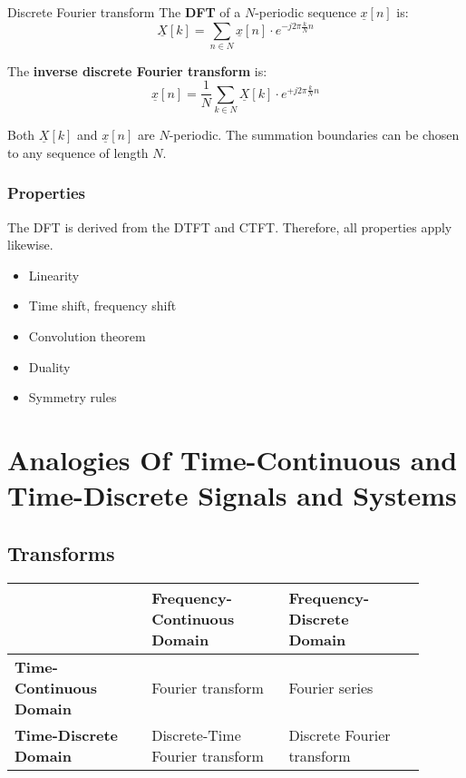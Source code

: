 \begin{refsection}
\begin{definition}{Discrete Fourier transform}
	The  \textbf{\acf{DFT}} of a $N$-periodic sequence $\underline{x}[n]$ is:
	\begin{equation}
		\underline{X}[k] = \sum\limits_{n \in N} \underline{x}[n] \cdot e^{-j 2\pi \frac{k}{N} n}
	\end{equation}
	
	The  \textbf{inverse discrete Fourier transform} is:
	\begin{equation}
		\underline{x}[n] = \frac{1}{N} \sum\limits_{k \in N} \underline{X}[k] \cdot e^{+ j 2\pi \frac{k}{N} n}
	\end{equation}
	
	Both $\underline{X}[k]$ and $\underline{x}[n]$ are $N$-periodic. The summation boundaries can be chosen to any sequence of length $N$.
\end{definition}

\subsubsection{Properties}

The \ac{DFT} is derived from the \ac{DTFT} and \ac{CTFT}. Therefore, all properties apply likewise.
\begin{itemize}
	\item Linearity
	\item Time shift, frequency shift
	\item Convolution theorem
	\item Duality
	\item Symmetry rules
\end{itemize}

\section{Analogies Of Time-Continuous and Time-Discrete Signals and Systems}

\subsection{Transforms}

\begin{table}[H]
	\centering
	\begin{tabular}{|p{0.3\linewidth}||p{0.3\linewidth}|p{0.3\linewidth}|}
		\hline
		{} & \textbf{Frequency-Continuous Domain} & \textbf{Frequency-Discrete Domain} \\
		\hline
		\hline
		\textbf{Time-Continuous Domain} & Fourier transform & Fourier series \\
		\hline
		\textbf{Time-Discrete Domain} & Discrete-Time Fourier transform & Discrete Fourier transform \\
		\hline
	\end{tabular}
\end{table}


\end{refsection}
